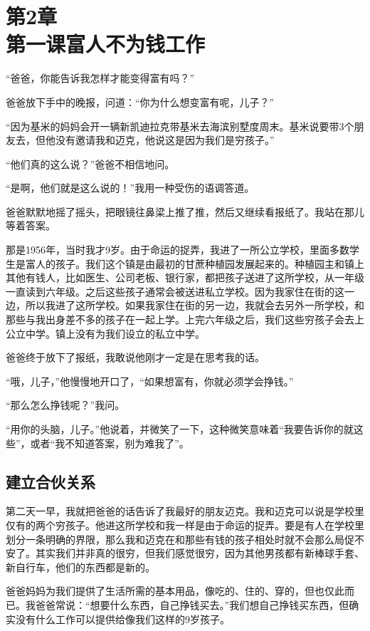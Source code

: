 \section[第2章\q 第一课\q 富人不为钱工作]{第2章\\第一课\q 富人不为钱工作}

“爸爸，你能告诉我怎样才能变得富有吗？”

爸爸放下手中的晚报，问道：“你为什么想变富有呢，儿子？”

“因为基米的妈妈会开一辆新凯迪拉克带基米去海滨别墅度周末。基米说要带3个朋友去，但他没有邀请我和迈克，他说这是因为我们是穷孩子。”

“他们真的这么说？”爸爸不相信地问。

“是啊，他们就是这么说的！”我用一种受伤的语调答道。

爸爸默默地摇了摇头，把眼镜往鼻梁上推了推，然后又继续看报纸了。我站在那儿等着答案。

那是1956年，当时我才9岁。由于命运的捉弄，我进了一所公立学校，里面多数学生是富人的孩子。我们这个镇是由最初的甘蔗种植园发展起来的。种植园主和镇上其他有钱人，比如医生、公司老板、银行家，都把孩子送进了这所学校，从一年级一直读到六年级。之后这些孩子通常会被送进私立学校。因为我家住在街的这一边，所以我进了这所学校。如果我家住在街的另一边，我就会去另外一所学校，和那些与我出身差不多的孩子在一起上学。上完六年级之后，我们这些穷孩子会去上公立中学。镇上没有为我们设立的私立中学。

爸爸终于放下了报纸，我敢说他刚才一定是在思考我的话。

“哦，儿子，”他慢慢地开口了，“如果想富有，你就必须学会挣钱。”

“那么怎么挣钱呢？”我问。

“用你的头脑，儿子。”他说着，并微笑了一下，这种微笑意味着“我要告诉你的就这些”，或者“我不知道答案，别为难我了”。

\subsection*{建立合伙关系}

第二天一早，我就把爸爸的话告诉了我最好的朋友迈克。我和迈克可以说是学校里仅有的两个穷孩子。他进这所学校和我一样是由于命运的捉弄。要是有人在学校里划分一条明确的界限，那么我和迈克在和那些有钱的孩子相处时就不会那么局促不安了。其实我们并非真的很穷，但我们感觉很穷，因为其他男孩都有新棒球手套、新自行车，他们的东西都是新的。

爸爸妈妈为我们提供了生活所需的基本用品，像吃的、住的、穿的，但也仅此而已。我爸爸常说：“想要什么东西，自己挣钱买去。”我们想自己挣钱买东西，但确实没有什么工作可以提供给像我们这样的9岁孩子。

